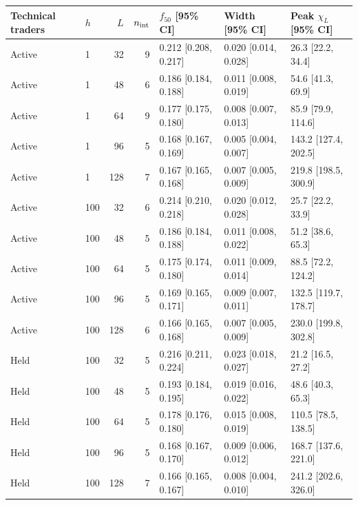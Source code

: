 \begin{center}
\begin{minipage}{\linewidth}\centering
\captionsetup{type=table,hypcap=false}
\caption{Grid-size comparisons over 50 starting markets and 3,000 post-switch steps. Brackets give 95\% confidence intervals (CI) from 2,000 whole-market bootstrap samples. $n_{\rm int}$ counts tested fractions with majority probability strictly between 0.05 and 0.95. The fractions $f_{25}$, $f_{50}$, and $f_{75}$ are the first upward crossings of majority probability 0.25, 0.5, and 0.75, found by linear interpolation between tested fractions, and the width is $f_{75}-f_{25}$. The susceptibility maximum is taken over the tested fractions and is selected again in each bootstrap sample.}
\label{tab:finite-size-scaling}
\footnotesize\setlength{\tabcolsep}{3pt}
\begin{tabular}{llrrlll}
\toprule
Technical traders & $h$ & $L$ & $n_{\rm int}$ & $f_{50}$ [95\% CI] & Width [95\% CI] & Peak $\chi_L$ [95\% CI] \\
\midrule
Active & 1 & 32 & 9 & 0.212 [0.208, 0.217] & 0.020 [0.014, 0.028] & 26.3 [22.2, 34.4] \\
Active & 1 & 48 & 6 & 0.186 [0.184, 0.188] & 0.011 [0.008, 0.019] & 54.6 [41.3, 69.9] \\
Active & 1 & 64 & 9 & 0.177 [0.175, 0.180] & 0.008 [0.007, 0.013] & 85.9 [79.9, 114.6] \\
Active & 1 & 96 & 5 & 0.168 [0.167, 0.169] & 0.005 [0.004, 0.007] & 143.2 [127.4, 202.5] \\
Active & 1 & 128 & 7 & 0.167 [0.165, 0.168] & 0.007 [0.005, 0.009] & 219.8 [198.5, 300.9] \\
\midrule
Active & 100 & 32 & 6 & 0.214 [0.210, 0.218] & 0.020 [0.012, 0.028] & 25.7 [22.2, 33.9] \\
Active & 100 & 48 & 5 & 0.186 [0.184, 0.188] & 0.011 [0.008, 0.022] & 51.2 [38.6, 65.3] \\
Active & 100 & 64 & 5 & 0.175 [0.174, 0.180] & 0.011 [0.009, 0.014] & 88.5 [72.2, 124.2] \\
Active & 100 & 96 & 5 & 0.169 [0.165, 0.171] & 0.009 [0.007, 0.011] & 132.5 [119.7, 178.7] \\
Active & 100 & 128 & 6 & 0.166 [0.165, 0.168] & 0.007 [0.005, 0.009] & 230.0 [199.8, 302.8] \\
\midrule
Held & 100 & 32 & 5 & 0.216 [0.211, 0.224] & 0.023 [0.018, 0.027] & 21.2 [16.5, 27.2] \\
Held & 100 & 48 & 5 & 0.193 [0.184, 0.195] & 0.019 [0.016, 0.022] & 48.6 [40.3, 65.3] \\
Held & 100 & 64 & 5 & 0.178 [0.176, 0.180] & 0.015 [0.008, 0.019] & 110.5 [78.5, 138.5] \\
Held & 100 & 96 & 5 & 0.168 [0.167, 0.170] & 0.009 [0.006, 0.012] & 168.7 [137.6, 221.0] \\
Held & 100 & 128 & 7 & 0.166 [0.165, 0.167] & 0.008 [0.004, 0.010] & 241.2 [202.6, 326.0] \\
\bottomrule
\end{tabular}
\end{minipage}
\end{center}

